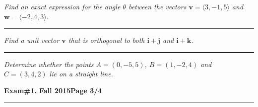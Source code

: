 \documentclass[12pt]{article}
\begin{document}
{\problem[15 pts] \em Find an exact expression for the angle $\theta$ between
the vectors $\boldsymbol{v}=\langle 3, -1, 5\rangle$ and
$\boldsymbol{w}=\langle -2, 4, 3\rangle$.} 
\vspace{3cm}
\begin{flushright}
\end{flushright}
\hrule

{\problem[15 pts] \em Find a unit vector $\boldsymbol{v}$ that is orthogonal
to both $\boldsymbol{i} + \boldsymbol{j}$ and $\boldsymbol{i} +
\boldsymbol{k}$.} 
\vspace{4cm}
\begin{flushright}
\end{flushright}
\hrule

{\problem[15 pts] \em Determine whether the points $A=(0,-5,5)$, $ B=(1,-2,4)$ and $C=(3,4,2)$ lie on a straight line.}
\newpage

\hfill{\large\bf Exam\#1.}\hfill{\large\bf
  Fall 2015}\hfill{\large\bf Page 3/4}\hrule
\end{document}
